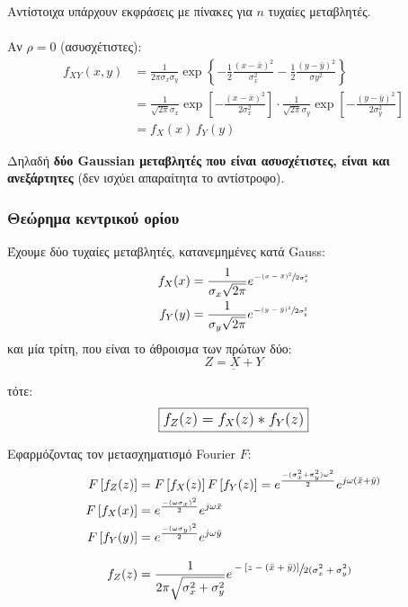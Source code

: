 \documentclass[11pt,a4paper,notitlepage,fleqn,draft]{article}
\begin{document}
Αντίστοιχα υπάρχουν εκφράσεις με πίνακες για \( n \) τυχαίες μεταβλητές.

\paragraph{}Αν \( \rho = 0 \) (ασυσχέτιστες):
\begin{align*}
f_{XY}(x,y) &= \frac{1}{2\pi \sigma_x\sigma_y}\exp \left\lbrace 
-\frac{1}{2}\frac{(x-\bar x)^2}{\sigma_x^2}
-\frac{1}{2}\frac{(y-\bar y)^2}{\sigma y^2}
 \right\rbrace \\ &=
 \frac{1}{\sqrt{2\pi} \sigma_x}\exp\left[
 -\frac{(x-\bar x)^2}{2\sigma_x^2}\right]
 \cdot\frac{1}{\sqrt{2\pi}\sigma_y}\exp\left[
 -\frac{(y-\bar y)^2}{2\sigma_y^2}\right]
 \\ &= f_X(x) \, f_Y(y)
\end{align*}

Δηλαδή \textbf{δύο Gaussian μεταβλητές που είναι ασυσχέτιστες, είναι και
	ανεξάρτητες} (δεν ισχύει απαραίτητα το αντίστροφο).

\subsubsection{Θεώρημα κεντρικού ορίου}
Έχουμε δύο τυχαίες μεταβλητές, κατανεμημένες κατά Gauss:
\begin{align*}
	f_X(x) &= \frac{1}{\sigma_x \sqrt{2\pi}}
	e^{-\sfrac{(x-\bar x)^2}{2\sigma_x^2} } \\
	f_Y(y) &= \frac{1}{\sigma_y\sqrt{2\pi}}
	e^{-\sfrac{(y-\bar y)^2}{2\sigma_y^2} }
\end{align*}
και μία τρίτη, που είναι το άθροισμα των πρώτων δύο:
\[
\underline{Z=X+Y}
\]

τότε:
\[
\boxed{
\mathlarger{f_Z(z) = f_X(z) * f_Y(z)}
}
\]

Εφαρμόζοντας τον μετασχηματισμό Fourier \( F \):
\begin{align*}
	F\left[f_Z(z)\right] &= F\left[f_X(z)\right]
	F\left[f_Y(z)\right] = 
	e^{\frac{-(\sigma_x^2+\sigma_y^2)\omega^2}{2}}
	e^{j\omega (\bar x+\bar y)}
	\\
	F\left[f_X(x)\right] &= e^{\frac{-(\omega\sigma_x)^2}{2}}
	e^{j\omega \bar x}
	\\
	F\left[f_Y(y)\right] &= e^{\frac{-(\omega \sigma_y)^2}{2}}
	e^{j\omega \bar y}
	\\[2ex]
	f_Z(z) &= \frac{1}{2\pi\sqrt{\sigma_x^2+\sigma_y^2}}
	e^{\displaystyle \sfrac{
		-\left[z-(\bar x+\bar y)\right]
	}{2(\sigma_x^2+\sigma_y^2)}
		}
\end{align*}
\end{document}
